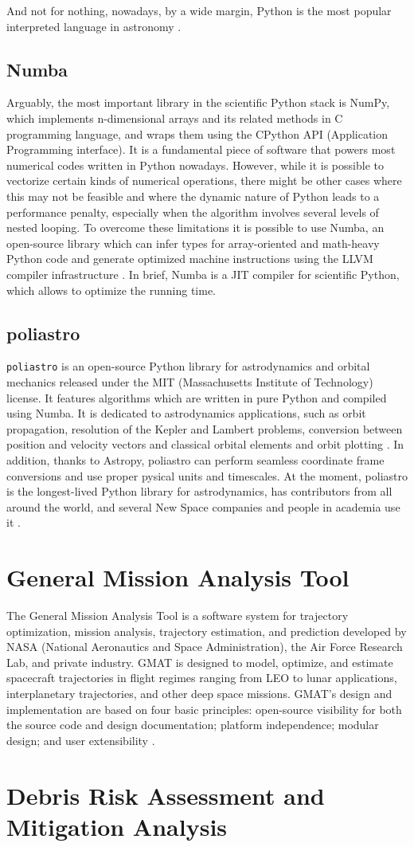 And not for nothing, nowadays, by a wide margin, Python is the most popular interpreted language in astronomy
\cite{momcheva2015software}.

\subsection{Numba}
Arguably, the most important library in the scientific Python stack is NumPy, which implements n-dimensional arrays and its related methods in C programming language, and wraps them using the CPython API (Application Programming interface).
It is a fundamental piece of software that powers most numerical codes written in Python nowadays.
However, while it is possible to vectorize certain kinds of numerical operations, there might be other cases where this may not be feasible and where the dynamic nature of Python leads to a performance penalty, especially when the algorithm involves several levels of nested looping.
To overcome these limitations it is possible to use Numba, an open-source library which can infer types for array-oriented and math-heavy Python code and generate optimized machine instructions using the LLVM compiler infrastructure
\cite{rodriguez2016poliastro}.
In brief, Numba is a JIT compiler for scientific Python, which allows to optimize the running time.

\subsection{poliastro}
\texttt{poliastro} is an open-source Python library for astrodynamics and orbital mechanics released under the MIT (Massachusetts Institute of Technology) license.
It features algorithms which are written in pure Python and compiled using Numba.
It is dedicated to astrodynamics applications, such as orbit propagation, resolution of the Kepler and Lambert problems, conversion between position and velocity vectors and classical orbital elements and orbit plotting
\cite{rodriguez2016poliastro}.
In addition, thanks to Astropy, poliastro can perform seamless coordinate frame conversions and use proper pysical units and timescales.
At the moment, poliastro is the longest-lived Python library for astrodynamics, has contributors from all around the world, and several New Space companies and people in academia use it
\cite{rodriguez2022poliastro}.

\section{General Mission Analysis Tool}
The General Mission Analysis Tool is a software system for trajectory optimization, mission analysis, trajectory estimation, and prediction developed by NASA (National Aeronautics and Space Administration), the Air Force Research Lab, and private industry.
GMAT is designed to model, optimize, and estimate spacecraft trajectories in flight regimes ranging from LEO to lunar applications, interplanetary trajectories, and other deep space missions.
GMAT's design and implementation are based on four basic principles: open-source visibility for both the source code and design documentation; platform independence; modular design; and user extensibility
\cite{conway2010general}.

\section{Debris Risk Assessment and Mitigation Analysis}
